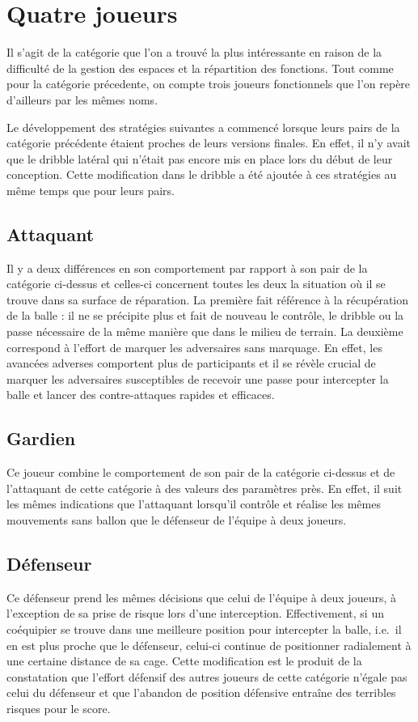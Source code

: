 \documentclass[12pt,a4paper]{article}
\begin{document}
\section{Quatre joueurs}
Il s'agit de la cat\'egorie que l'on a trouv\'e la plus int\'eressante en 
raison de la difficult\'e de la gestion des espaces et la r\'epartition des 
fonctions. Tout comme pour la cat\'egorie pr\'ecedente, on compte trois 
joueurs fonctionnels que l'on rep\`ere d'ailleurs par les m\^emes noms. 

Le d\'eveloppement des strat\'egies suivantes a commenc\'e lorsque leurs pairs 
de la cat\'egorie pr\'ec\'edente \'etaient proches de leurs versions finales. 
En effet, il n'y avait que le dribble lat\'eral qui n'\'etait pas encore mis en 
place lors du d\'ebut de leur conception. 
Cette modification dans le dribble a \'et\'e ajout\'ee \`a ces strat\'egies au 
m\^eme temps que pour leurs pairs.

\subsection*{Attaquant}
Il y a deux diff\'erences en son comportement par rapport \`a son pair 
de la cat\'egorie ci-dessus et celles-ci concernent toutes les deux la 
situation o\`u il se trouve dans sa surface de r\'eparation. La premi\`ere fait 
r\'ef\'erence \`a la r\'ecup\'eration de la balle : il ne se 
pr\'ecipite plus et fait de nouveau le contr\^ole, le dribble ou la passe 
n\'ecessaire de la m\^eme mani\`ere que dans le milieu de terrain. 
La deuxi\`eme correspond \`a l'effort de marquer les adversaires sans 
marquage. En effet, les avanc\'ees adverses comportent plus de participants et 
il se r\'ev\`ele crucial de marquer les adversaires susceptibles de 
recevoir une passe pour intercepter la balle et lancer des contre-attaques 
rapides et efficaces.

\subsection*{Gardien}
Ce joueur combine le comportement de son pair de la cat\'egorie ci-dessus et de 
l'attaquant de cette cat\'egorie \`a des valeurs des param\`etres pr\`es. En 
effet, il suit les m\^emes indications que 
l'attaquant lorsqu'il contr\^ole et r\'ealise les m\^emes mouvements sans ballon 
que le d\'efenseur de l'\'equipe \`a deux joueurs.

\subsection*{D\'efenseur}
Ce d\'efenseur prend les m\^emes d\'ecisions que celui de l'\'equipe \`a 
deux joueurs, \`a l'exception de sa prise de risque lors d'une interception. 
Effectivement, si un co\'equipier se trouve dans une meilleure position pour 
intercepter la balle, i.e.\ il en est plus proche que le d\'efenseur, celui-ci 
continue de positionner radialement \`a une certaine distance de sa cage. Cette 
modification est le produit de la constatation que l'effort d\'efensif des 
autres joueurs de cette cat\'egorie n'\'egale pas celui du d\'efenseur et que 
l'abandon de position d\'efensive entra\^ine des terribles risques pour le 
score.
\end{document}

